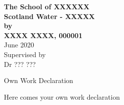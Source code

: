 \documentclass[11pt,twoside]{article}
\numberwithin{Theorem}{section}
\numberwithin{Definition}{section}
\numberwithin{Lemma}{section}
\numberwithin{Algorithm}{section}
\numberwithin{equation}{section}
\begin{document}
\pagestyle{empty}

\begin{titlepage}
\vspace*{.5em}
\center
\textbf{\large{The School of XXXXXX}} \\
\vspace*{1em}
\vspace{2em}
\textbf{\Huge{Scotland Water - XXXXX}}\\[2em]
\textbf{\LARGE{by}}\\
\vspace{2em}
\textbf{\LARGE{XXXX XXXX, 000001}}\\
\vspace{6.5em}
\vspace{6.5em}
\Large{June 2020}\\
\vspace{3em}
\normalsize{Supervised by\\Dr ??? ???}
\vfill
\end{titlepage}

\clearpage





\begin{center}
\Large{Own Work Declaration}
\end{center}
Here comes your own work declaration

\cleardoublepage




\tableofcontents
\clearpage

\pagestyle{plain}
\setcounter{page}{1}

\cleardoublepage
\end{document}
